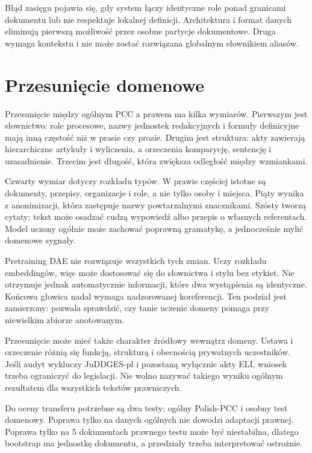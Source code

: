 Błąd zasięgu pojawia się, gdy system łączy identyczne role ponad granicami dokumentu lub nie respektuje lokalnej definicji. Architektura i format danych eliminują pierwszą możliwość przez osobne partycje dokumentowe. Druga wymaga kontekstu i nie może zostać rozwiązana globalnym słownikiem aliasów.

\section{Przesunięcie domenowe}
\label{sec:przesuniecie-domenowe}

Przesunięcie między ogólnym PCC a prawem ma kilka wymiarów. Pierwszym jest słownictwo: role procesowe, nazwy jednostek redakcyjnych i formuły definicyjne mają inną częstość niż w prasie czy prozie. Drugim jest struktura: akty zawierają hierarchiczne artykuły i wyliczenia, a orzeczenia komparycję, sentencję i uzasadnienie. Trzecim jest długość, która zwiększa odległość między wzmiankami.

Czwarty wymiar dotyczy rozkładu typów. W prawie częściej istotne są dokumenty, przepisy, organizacje i role, a nie tylko osoby i miejsca. Piąty wynika z anonimizacji, która zastępuje nazwy powtarzalnymi znacznikami. Szósty tworzą cytaty: tekst może osadzać cudzą wypowiedź albo przepis o własnych referentach. Model uczony ogólnie może zachować poprawną gramatykę, a jednocześnie mylić domenowe sygnały.

Pretraining DAE nie rozwiązuje wszystkich tych zmian. Uczy rozkładu embeddingów, więc może dostosować się do słownictwa i stylu bez etykiet. Nie otrzymuje jednak automatycznie informacji, które dwa wystąpienia są identyczne. Końcowa głowica nadal wymaga nadzorowanej koreferencji. Ten podział jest zamierzony: pozwala sprawdzić, czy tanie uczenie domeny pomaga przy niewielkim zbiorze anotowanym.

Przesunięcie może mieć także charakter źródłowy wewnątrz domeny. Ustawa i orzeczenie różnią się funkcją, strukturą i obecnością prywatnych uczestników. Jeśli audyt wykluczy JuDDGES-pl i pozostaną wyłącznie akty ELI, wniosek trzeba ograniczyć do legislacji. Nie wolno nazywać takiego wyniku ogólnym rezultatem dla wszystkich tekstów prawniczych.

Do oceny transferu potrzebne są dwa testy: ogólny Polish-PCC i osobny test domenowy. Poprawa tylko na danych ogólnych nie dowodzi adaptacji prawnej. Poprawa tylko na 5 dokumentach prawnego testu może być niestabilna, dlatego bootstrap ma jednostkę dokumentu, a przedziały trzeba interpretować ostrożnie.

